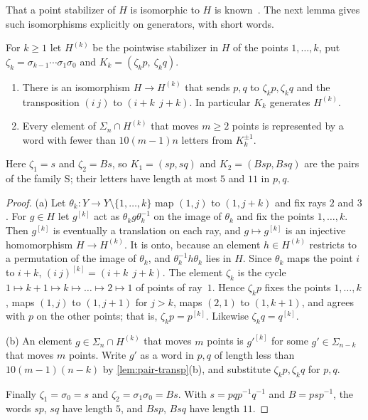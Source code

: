 That a point stabilizer of $H$ is isomorphic to $H$ is known~\cite[Example~3.6]{Cor06}. The next lemma gives such isomorphisms explicitly
on generators, with short words.

\begin{lemma}\label{lem:pair-stab}
For $k\ge1$ let $H^{(k)}$ be the pointwise stabilizer in $H$ of the points $1,\dots,k$, put $\zeta_k=\sigma_{k-1}\cdots\sigma_1\sigma_0$ and
$K_k=(\zeta_kp,\ \zeta_kq)$.
\begin{enumerate}[label=(\alph*),itemsep=1pt]
\item There is an isomorphism $H\to H^{(k)}$ that sends $p,q$ to $\zeta_kp,\zeta_kq$ and the transposition $(i\ j)$ to
$(i{+}k\ \ j{+}k)$. In particular $K_k$ generates $H^{(k)}$.
\item Every element of $\Sigma_n\cap H^{(k)}$ that moves $m\ge2$ points is represented by a word with fewer than $10(m-1)n$ letters from
$K_k^{\pm1}$.
\end{enumerate}
Here $\zeta_1=s$ and $\zeta_2=Bs$, so $K_1=(sp,sq)$ and $K_2=(Bsp,Bsq)$ are the pairs of the family \textsf{S}; their letters have length
at most $5$ and $11$ in $p,q$.
\end{lemma}

\begin{proof}
(a) Let $\theta_k:Y\to Y\setminus\{1,\dots,k\}$ map $(1,j)$ to $(1,j+k)$ and fix rays $2$ and $3$. For $g\in H$ let $g^{[k]}$ act as
$\theta_kg\theta_k^{-1}$ on the image of $\theta_k$ and fix the points $1,\dots,k$. Then $g^{[k]}$ is eventually a translation on each ray,
and $g\mapsto g^{[k]}$ is an injective homomorphism $H\to H^{(k)}$. It is onto, because an element $h\in H^{(k)}$ restricts to a
permutation of the image of $\theta_k$, and $\theta_k^{-1}h\theta_k$ lies in $H$. Since $\theta_k$ maps the point $i$ to $i+k$, $(i\ j)^{[k]}=(i{+}k\ \ j{+}k)$. The element
$\zeta_k$ is the cycle $1\mapsto k{+}1\mapsto k\mapsto\dots\mapsto2\mapsto1$ of points of ray~$1$. Hence $\zeta_kp$ fixes the points
$1,\dots,k$, maps $(1,j)$ to $(1,j+1)$ for $j>k$, maps $(2,1)$ to $(1,k+1)$, and agrees with $p$ on the other points; that is,
$\zeta_kp=p^{[k]}$. Likewise $\zeta_kq=q^{[k]}$.

(b) An element $g\in\Sigma_n\cap H^{(k)}$ that moves $m$ points is $g'^{[k]}$ for some $g'\in\Sigma_{n-k}$ that moves $m$ points. Write $g'$
as a word in $p,q$ of length less than $10(m-1)(n-k)$ by \cref{lem:pair-transp}(b), and substitute $\zeta_kp,\zeta_kq$ for $p,q$.

Finally $\zeta_1=\sigma_0=s$ and $\zeta_2=\sigma_1\sigma_0=Bs$. With $s=pqp^{-1}q^{-1}$ and $B=psp^{-1}$, the words $sp$, $sq$ have length
$5$, and $Bsp$, $Bsq$ have length $11$.
\end{proof}

